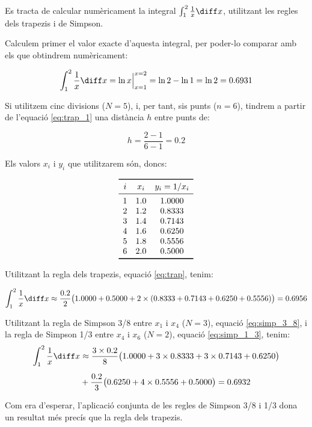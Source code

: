 \begin{exemple}\label{ex:IntegracioNum}
	\addcontentsxms{\IntegracioNum}
    Es tracta de calcular numèricament la integral $\int_1^2 \frac{1}{x} \diff x$, utilitzant les regles dels trapezis i de Simpson.

    Calculem primer el valor exacte d'aquesta integral, per  poder-lo comparar amb els que obtindrem  numèricament:

    \[
      \int_1^2 \frac{1}{x} \diff x = \ln x \Bigr|_{x=1}^{x=2} = \ln 2 - \ln 1 = \ln 2 = \num{0,6931}
    \]

    Si utilitzem cinc divisions ($N=5$), i, per tant, sis punts ($n=6$), tindrem a partir de l'equació \eqref{eq:trap_1} una distància $h$ entre punts de:

    \[
        h = \frac{2-1}{6-1} = \num{0,2}
    \]

    Els valors $x_i$ i $y_i$ que utilitzarem són, doncs:
    \vspace{-8mm}
    \begin{center}
        \[\begin{array}{ccc}
           \toprule[1pt]
              i & x_i  & y_i = 1/x_i \\
           \midrule
              1 & \num{1,0} & \num{1,0000} \\
              2 & \num{1,2} & \num{0,8333} \\
              3 & \num{1,4} & \num{0,7143} \\
              4 & \num{1,6} & \num{0.6250} \\
              5 & \num{1,8} & \num{0.5556} \\
              6 & \num{2,0} & \num{0,5000} \\
           \bottomrule[1pt]
        \end{array} \]
    \end{center}

    \pagebreak
    Utilitzant la regla dels trapezis, equació \eqref{eq:trap}, tenim:

    \[
        \int_1^2 \frac{1}{x} \diff x \approx \frac{\num{0,2}}{2} \big(\num{1,0000}+\num{0,5000} +2 \times(\num{0,8333}+ \num{0,7143} +
        \num{0,6250} + \num{0,5556}) \big) = \num{0,6956}
    \]

    Utilitzant la regla de Simpson 3/8 entre $x_1$ i $x_4$ ($N=3$), equació \eqref{eq:simp_3_8}, i la  regla de Simpson 1/3 entre $x_4$ i $x_6$ ($N=2$), equació \eqref{eq:simp_1_3}, tenim:
    \[\begin{split}
        \int_1^2 \frac{1}{x} \diff x &\approx \frac{3\times\num{0,2}}{8} \big(\num{1,0000}+3\times\num{0,8333} +3\times \num{0,7143} +
        \num{0,6250} \big) \\[0.5em]
        {}&+ \frac{\num{0,2}}{3} \big(\num{0,6250} +4\times \num{0,5556} + \num{0,5000} \big)
        = \num{0,6932}
    \end{split}\]

    Com era d'esperar, l'aplicació conjunta de les regles de Simpson 3/8 i 1/3 dona un resultat més precís que la regla dels trapezis.
\end{exemple}




